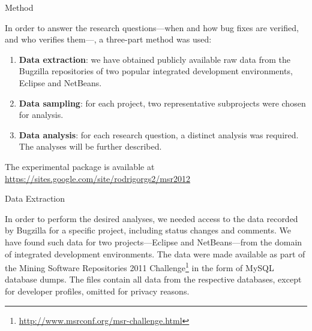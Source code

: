 \begin{section}{Method} \label{sec:methods}


	In order to answer the research questions---when and how bug fixes are verified, and who verifies them---, a three-part method was used:
	
	\begin{enumerate}
		\item \textbf{Data extraction}: we have obtained publicly available raw data from the Bugzilla repositories of two popular integrated development environments, Eclipse and NetBeans.

		\item \textbf{Data sampling}: for each project, two representative subprojects were chosen for analysis.
		
		
		
		\item \textbf{Data analysis}: for each research question, a distinct analysis was required. The analyses will be further described.
	\end{enumerate}	
	
	The experimental package is available at \\ \url{https://sites.google.com/site/rodrigorgs2/msr2012}

\begin{subsection}{Data Extraction}
	
	In order to perform the desired analyses, we needed access to the data recorded by Bugzilla for a specific project, including status changes and comments. We have found such data for two projects---Eclipse and NetBeans---from the domain of integrated development environments. The data were made available as part of the Mining Software Repositories 2011 Challenge\footnote{\url{http://www.msrconf.org/msr-challenge.html}} in the form of MySQL database dumps. The files contain all data from the respective databases, except for developer profiles, omitted for privacy reasons.
	

\end{subsection}
\end{section}
